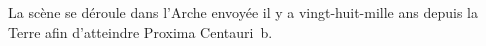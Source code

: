 \documentclass[a4paper,12pt,twoside,french]{book}
\begin{document}
\begin{titlepage}
\begin{center}
\begin{adjustwidth}{3.5cm}{3.5cm}
        \begin{center}
        La scène se déroule dans l’Arche envoyée il y a vingt-huit-mille ans depuis la Terre afin d’atteindre Proxima Centauri~b.
        \end{center}
      \end{adjustwidth}


      \makeatletter
        \vspace{0cm}\large \@author

      \vspace{.5cm}\large \@date
      \makeatother


      \vspace*{2cm}
      \vfill
    \end{center}
    \restoregeometry
  \end{titlepage}
\end{document}
